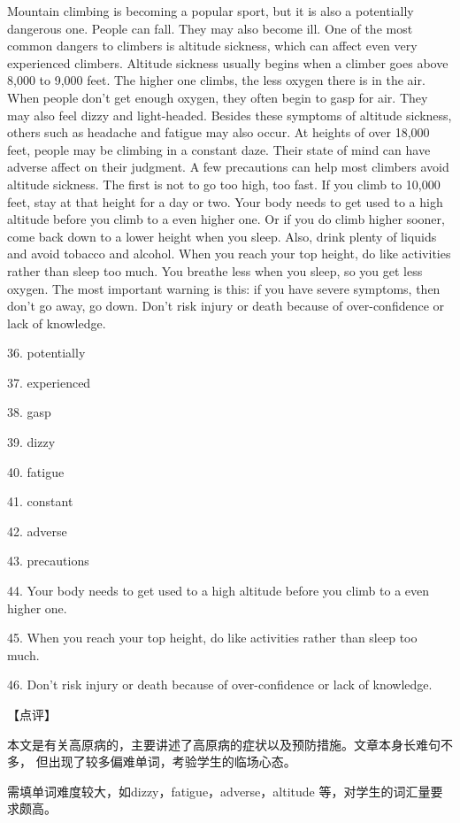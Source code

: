 \documentclass[UTF8,11pt]{ctexart}
\begin{document}
Mountain climbing is becoming a popular sport, but it is also a potentially dangerous one. People can fall. They may also become ill. One of the most common dangers to climbers is altitude sickness, which can affect even very experienced climbers. Altitude sickness usually begins when a climber goes above 8,000 to 9,000 feet. The higher one climbs, the less oxygen there is in the air. When people don’t get enough oxygen, they often begin to gasp for air. They may also feel dizzy and light-headed. Besides these symptoms of altitude sickness, others such as headache and fatigue may also occur. At heights of over 18,000 feet, people may be climbing in a constant daze. Their state of mind can have adverse affect on their judgment. A few precautions can help most climbers avoid altitude sickness. The first is not to go too high, too fast. If you climb to 10,000 feet, stay at that height for a day or two. Your body needs to get used to a high altitude before you climb to a even higher one. Or if you do climb higher sooner, come back down to a lower height when you sleep. Also, drink plenty of liquids and avoid tobacco and alcohol. When you reach your top height, do like activities rather than sleep too much. You breathe less when you sleep, so you get less oxygen. The most important warning is this: if you have severe symptoms, then don’t go away, go down. Don’t risk injury or death because of over-confidence or lack of knowledge.


36. potentially


37. experienced


38. gasp


39. dizzy


40. fatigue


41. constant


42. adverse


43. precautions


44. Your body needs to get used to a high altitude before you climb to a even higher one.


45. When you reach your top height, do like activities rather than sleep too much.


46. Don’t risk injury or death because of over-confidence or lack of knowledge.


【点评】


本文是有关高原病的，主要讲述了高原病的症状以及预防措施。文章本身长难句不多， 但出现了较多偏难单词，考验学生的临场心态。


需填单词难度较大，如dizzy，fatigue，adverse，altitude 等，对学生的词汇量要求颇高。
\end{document}
